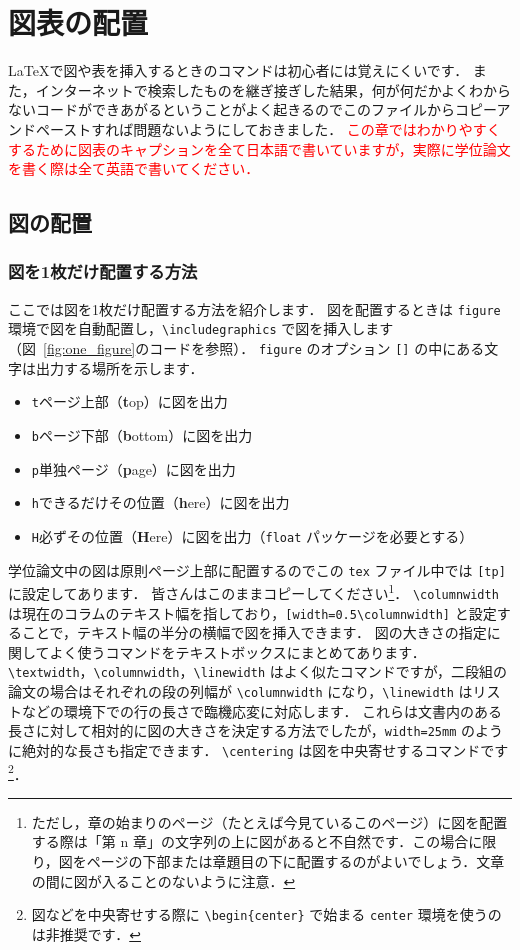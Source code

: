 \chapter{図表の配置}
\label{ch:figure_table}

\LaTeX で図や表を挿入するときのコマンドは初心者には覚えにくいです．
また，インターネットで検索したものを継ぎ接ぎした結果，何が何だかよくわからないコードができあがるということがよく起きるのでこのファイルからコピーアンドペーストすれば問題ないようにしておきました．
\textcolor{red}{この章ではわかりやすくするために図表のキャプションを全て日本語で書いていますが，実際に学位論文を書く際は全て英語で書いてください．}

\section{図の配置}
\label{sec:figure}

\subsection{図を1枚だけ配置する方法}
\label{ssec:figure_sigle}

ここでは図を1枚だけ配置する方法を紹介します．
図を配置するときは \verb|figure| 環境で図を自動配置し，\verb|\includegraphics| で図を挿入します（図~\ref{fig:one_figure}のコードを参照）．
\verb|figure| のオプション \verb|[]| の中にある文字は出力する場所を示します．
\begin{itemize}
    \item \verb|t|\quad ページ上部（\textbf{t}op）に図を出力
    \item \verb|b|\quad ページ下部（\textbf{b}ottom）に図を出力
    \item \verb|p|\quad 単独ページ（\textbf{p}age）に図を出力
    \item \verb|h|\quad できるだけその位置（\textbf{h}ere）に図を出力
    \item \verb|H|\quad 必ずその位置（\textbf{H}ere）に図を出力（\verb|float| パッケージを必要とする）
\end{itemize}
学位論文中の図は原則ページ上部に配置するのでこの \verb|tex| ファイル中では \verb|[tp]| に設定してあります．
皆さんはこのままコピーしてください\footnote{ただし，章の始まりのページ（たとえば今見ているこのページ）に図を配置する際は「第 n 章」の文字列の上に図があると不自然です．この場合に限り，図をページの下部または章題目の下に配置するのがよいでしょう．文章の間に図が入ることのないように注意．}．
\verb|\columnwidth| は現在のコラムのテキスト幅を指しており，\verb|[width=0.5\columnwidth]| と設定することで，テキスト幅の半分の横幅で図を挿入できます．
図の大きさの指定に関してよく使うコマンドをテキストボックスにまとめてあります．
\verb|\textwidth|，\verb|\columnwidth|，\verb|\linewidth| はよく似たコマンドですが，二段組の論文の場合はそれぞれの段の列幅が \verb|\columnwidth| になり，\verb|\linewidth| はリストなどの環境下での行の長さで臨機応変に対応します．
これらは文書内のある長さに対して相対的に図の大きさを決定する方法でしたが，\verb|width=25mm| のように絶対的な長さも指定できます．
\verb|\centering| は図を中央寄せするコマンドです\footnote{図などを中央寄せする際に \texttt{\textbackslash begin\{center\}} で始まる \texttt{center} 環境を使うのは非推奨です．}．

